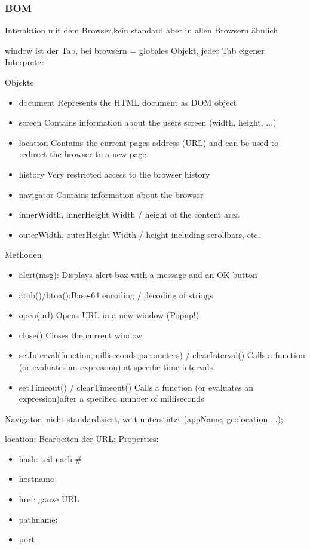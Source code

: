 \subsubsection*{BOM}
Interaktion mit dem Browser,kein standard aber in allen Browsern ähnlich 

window ist der Tab, bei browsern = globales Objekt, jeder Tab eigener Interpreter

Objekte
\begin{itemize}
\item document Represents the HTML document as DOM object
\item screen Contains information about the users screen 
(width, height, ...)
\item location Contains the current pages address (URL) and can be used to redirect the browser to a new page
\item history Very restricted access to the browser history
\item navigator Contains information about the browser
\item innerWidth, innerHeight Width / height of the content area
\item outerWidth, outerHeight Width / height including scrollbars, etc.

\end{itemize}

Methoden
\begin{itemize}
\item alert(msg): Displays alert-box with a message and an OK button
\item atob()/btoa():Base-64 encoding / decoding of strings
\item open(url)  Opens URL in a new window (Popup!) 
\item close() Closes the current window
\item setInterval(function,milliseconds,parameters) / clearInterval()
Calls a function (or evaluates an expression) at specific time intervals 
\item setTimeout() / clearTimeout() Calls a function (or evaluates an expression)after a specified number of milliseconds
\end{itemize}

Navigator: nicht standardisiert, weit unterstützt (appName, geolocation ...);

location: Bearbeiten der URL; 
Properties: 
\begin{itemize}
\item hash: teil nach \#
\item hostname
\item href: ganze URL
\item pathname:
\item port
\end{itemize}

